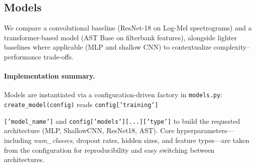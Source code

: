\subsection{Models}
We compare a convolutional baseline (ResNet-18 on Log-Mel spectrograms) and a transformer-based model (AST Base on filterbank features), alongside lighter baselines where applicable (MLP and shallow CNN) to contextualize complexity–performance trade-offs.

\paragraph{Implementation summary.}
Models are instantiated via a configuration-driven factory in \texttt{models.py}: \texttt{create\_model(config)} reads \texttt{config['training']}

\texttt{['model\_name']} and \texttt{config['models'][...]['type']} to build the requested architecture (MLP, ShallowCNN, ResNet18, AST). Core hyperparameters—including \textit{num\_classes}, dropout rates, hidden sizes, and feature types—are taken from the configuration for reproducibility and easy switching between architectures.


